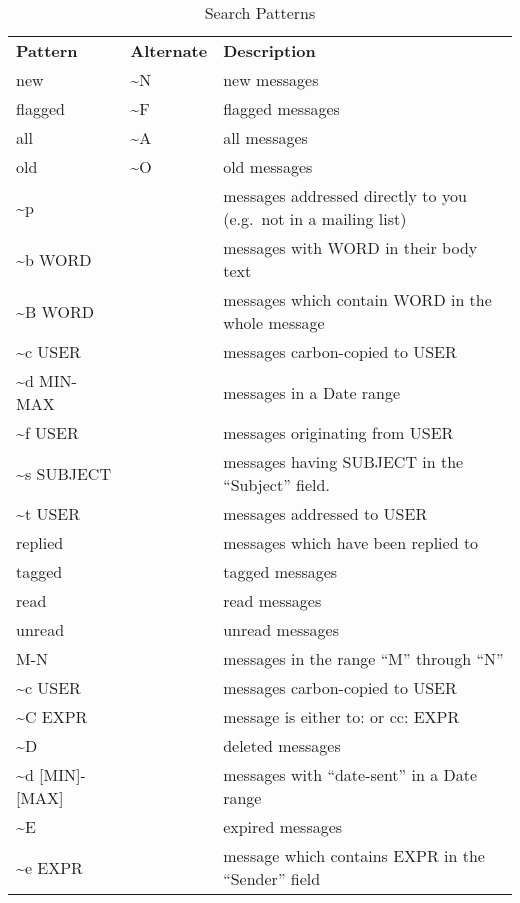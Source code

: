 \documentclass{article}
\begin{document}
\begin{table*}[!b]
\renewcommand{\arraystretch}{1.3}
\caption{Search Patterns}
\label{tab:patterns}
\footnotesize
\begin{tabulary}{\textwidth}{LLL}
  \textbf{Pattern} & \textbf{Alternate} & \textbf{Description}\\
  new & \textasciitilde{}N & new messages\\
  flagged & \textasciitilde{}F & flagged messages\\
  all & \textasciitilde{}A & all messages\\
  old & \textasciitilde{}O & old messages\\
  \textasciitilde{}p & & messages addressed directly to you (e.g.\ not in a mailing list)\\
  \textasciitilde{}b WORD & & messages with WORD in their body text\\
  \textasciitilde{}B WORD & & messages which contain WORD in the whole message\\
  \textasciitilde{}c USER & & messages carbon-copied to USER\\
  \textasciitilde{}d MIN-MAX & & messages in a Date range\\
  \textasciitilde{}f USER & & messages originating from USER\\
  \textasciitilde{}s SUBJECT & & messages having SUBJECT in the ``Subject'' field.\\
  \textasciitilde{}t USER & & messages addressed to USER\\
  replied & & messages which have been replied to\\
  tagged & & tagged messages\\
  read & & read messages\\
  unread & & unread messages\\
  M-N & & messages in the range ``M'' through ``N''\\
  \textasciitilde{}c USER & & messages carbon-copied to USER\\
  \textasciitilde{}C EXPR & & message is either to: or cc: EXPR\\
  \textasciitilde{}D & & deleted messages\\
  \textasciitilde{}d [MIN]-[MAX] & & messages with ``date-sent'' in a Date range\\
  \textasciitilde{}E & & expired messages\\
  \textasciitilde{}e EXPR & & message which contains EXPR in the ``Sender'' field\\

\end{tabulary}
\end{table*}
\end{document}
